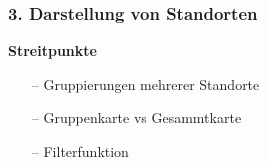 \documentclass[aspectratio=1610]{beamer}
\begin{document}
	\begin{frame}[plain]
	\frametitle{3. Darstellung von Standorten}
		\begin{minipage}{0.5\textwidth}
			\setlength{\fboxsep}{0pt}%
			\setlength{\fboxrule}{1pt}%
			\captionsetup{labelformat=empty}
			\centering
		\end{minipage}%
		\begin{minipage}{0.5\textwidth}
			\textbf{Streitpunkte}
			\begin{itemize}
				\setlength\itemsep{0.3em}
				\item[--] Gruppierungen mehrerer Standorte
				\item[--] Gruppenkarte vs Gesammtkarte
				\item[--] Filterfunktion
			\end{itemize}
		\end{minipage}%
	\end{frame}
	
\end{document}
